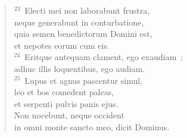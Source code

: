 \begin{flushleft}
\begin{verse}
${}^{23}$~Electi mei non laborabunt frustra,\\ neque generabunt in conturbatione,\\ quia semen benedictorum Domini est,\\ et nepotes eorum cum eis.\\
${}^{24}$~Eritque antequam clament, ego exaudiam~;\\ adhuc illis loquentibus, ego audiam.\\
${}^{25}$~Lupus et agnus pascentur simul,\\ leo et bos comedent paleas,\\ et serpenti pulvis panis ejus.\\ Non nocebunt, neque occident\\ in omni monte sancto meo, dicit Dominus.\end{verse}\end{flushleft}


